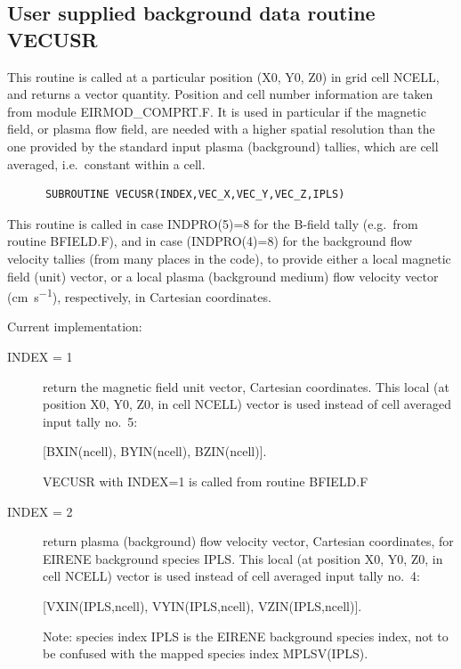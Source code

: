\subsection{User supplied background data routine VECUSR}
\label{sec3.6.2}

This routine is called at a particular position (X0, Y0, Z0) in grid cell
NCELL, and returns a vector quantity.
Position and cell number information are taken from module EIRMOD\_COMPRT.F.
It is used in particular if the magnetic field, or plasma flow field, are
needed with a higher spatial resolution than the one provided by the standard
input plasma (background) tallies, which are cell averaged, i.e.\ constant
within a cell.

\begin{lstlisting}
      SUBROUTINE VECUSR(INDEX,VEC_X,VEC_Y,VEC_Z,IPLS)
\end{lstlisting}

This routine is called in case INDPRO(5)=8 for the B-field tally (e.g.\ from
routine BFIELD.F), and in case (INDPRO(4)=8) for the background flow velocity
tallies (from many places in the code), to provide either a local magnetic
field (unit) vector, or a local plasma (background medium) flow velocity vector
(\si{\centi\metre\per\second}), respectively, in Cartesian coordinates.

Current implementation:
\begin{description}
  \item[INDEX = 1] return the magnetic field unit vector, Cartesian coordinates.
        This local (at position X0, Y0, Z0, in cell NCELL) vector is used instead of
        cell averaged input tally no.\ 5:

        [BXIN(ncell), BYIN(ncell), BZIN(ncell)].

        VECUSR with INDEX=1 is called from routine BFIELD.F
  \item[INDEX = 2] return
        plasma (background) flow velocity vector, Cartesian coordinates, for EIRENE
        background species IPLS.
        This local (at position X0, Y0, Z0, in cell NCELL) vector is used instead of
        cell averaged input tally no.\ 4:

        [VXIN(IPLS,ncell), VYIN(IPLS,ncell), VZIN(IPLS,ncell)].

        Note: species index IPLS is the EIRENE background species index, not to be
        confused with the mapped species index MPLSV(IPLS).
\end{description}

